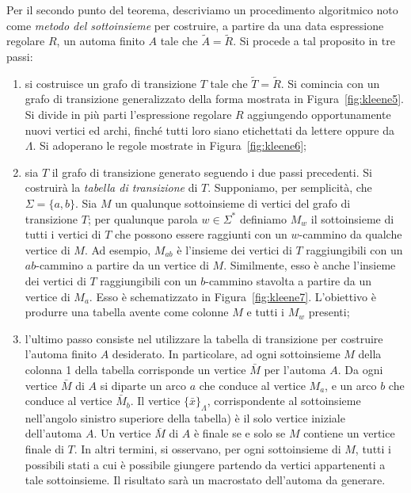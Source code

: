 \documentclass[10pt]{\classname}
\theoremstyle{newlinethm}
\theoremstyle{theorem}
\theoremstyle{definition}
\theoremstyle{definition}
\theoremstyle{definition}
\theoremstyle{definition}
\begin{document}
Per il secondo punto del teorema, descriviamo un procedimento algoritmico noto come \emph{metodo del sottoinsieme} per costruire, a partire da una data espressione regolare $R$, un automa finito $A$ tale che $\tilde A = \tilde R$. Si procede a tal proposito in tre passi:
\begin{enumerate}
    \item si costruisce un grafo di transizione $T$ tale che $\tilde T = \tilde R$. Si comincia con un grafo di transizione generalizzato della forma mostrata in Figura~\ref{fig:kleene5}. Si divide in più parti l'espressione regolare $R$ aggiungendo opportunamente nuovi vertici ed archi, finché tutti loro siano etichettati da lettere oppure da $\Lambda$. Si adoperano le regole mostrate in Figura~\ref{fig:kleene6};
    \item sia $T$ il grafo di transizione generato seguendo i due passi precedenti. Si costruirà la \emph{tabella di transizione} di $T$. Supponiamo, per semplicità, che $\Sigma = \{a,b\}$. Sia $M$ un qualunque sottoinsieme di vertici del grafo di transizione $T$; per qualunque parola $w \in \Sigma^*$ definiamo $M_w$ il sottoinsieme di tutti i vertici di $T$ che possono essere raggiunti con un $w$-cammino da qualche vertice di $M$. Ad esempio, $M_{ab}$ è l'insieme dei vertici di $T$ raggiungibili con un $ab$-cammino a partire da un vertice di $M$. Similmente, esso è anche l'insieme dei vertici di $T$ raggiungibili con un $b$-cammino stavolta a partire da un vertice di $M_a$. Esso è schematizzato in Figura~\ref{fig:kleene7}. L'obiettivo è produrre una tabella avente come colonne $M$ e tutti i $M_w$ presenti;
    \item l'ultimo passo consiste nel utilizzare la tabella di transizione per costruire l'automa finito $A$ desiderato. In particolare, ad ogni sottoinsieme $M$ della colonna 1 della tabella corrisponde un vertice $\bar M$ per l'automa $A$. Da ogni vertice $\bar M$ di $A$ si diparte un arco $a$ che conduce al vertice $M_a$, e un arco $b$ che conduce al vertice $\bar M_b$. Il vertice $\{\bar x\}_\Lambda$, corrispondente al sottoinsieme nell'angolo sinistro superiore della tabella) è il solo vertice iniziale dell'automa $A$. Un vertice $\bar M$ di $A$ è finale se e solo se $M$ contiene un vertice finale di $T$. In altri termini, si osservano, per ogni sottoinsieme di $M$, tutti i possibili stati a cui è possibile giungere partendo da vertici appartenenti a tale sottoinsieme. Il risultato sarà un macrostato dell'automa da generare.
\end{enumerate}
\end{document}
